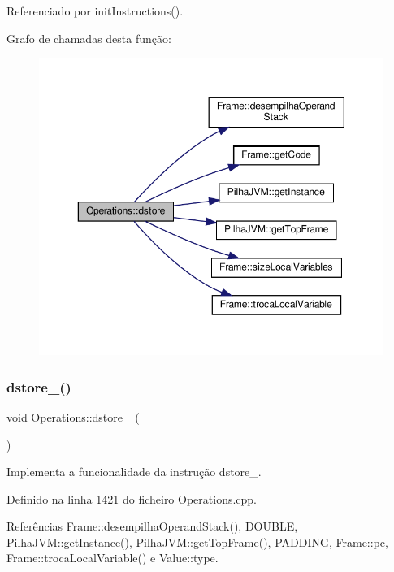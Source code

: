 Referenciado por init\+Instructions().

Grafo de chamadas desta função\+:\nopagebreak
\begin{figure}[H]
\begin{center}
\leavevmode
\includegraphics[width=350pt]{classOperations_a83fb57afed30b1223f8485492f9d9958_cgraph}
\end{center}
\end{figure}
\mbox{\label{classOperations_a54dd25692395f6671a3a8e21c73eef6d}} 
\subsubsection{\texorpdfstring{dstore\+\_()}{dstore\_0()}}
{\footnotesize\ttfamily void Operations\+::dstore\+\_ (\begin{DoxyParamCaption}{ }\end{DoxyParamCaption})\hspace{0.3cm}{\ttfamily [private]}}



Implementa a funcionalidade da instrução dstore\+\_. 



Definido na linha 1421 do ficheiro Operations.\+cpp.



Referências Frame\+::desempilha\+Operand\+Stack(), D\+O\+U\+B\+LE, Pilha\+J\+V\+M\+::get\+Instance(), Pilha\+J\+V\+M\+::get\+Top\+Frame(), P\+A\+D\+D\+I\+NG, Frame\+::pc, Frame\+::troca\+Local\+Variable() e Value\+::type.



